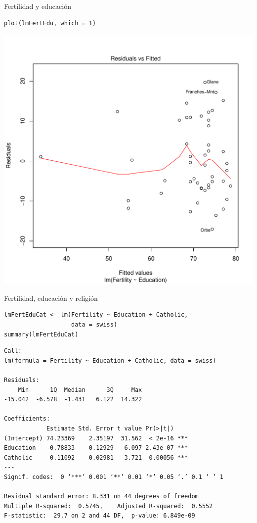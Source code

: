\documentclass[xcolor={usenames,svgnames,dvipsnames}]{beamer}
\begin{document}
\begin{frame}[fragile,label=sec-5-4]{Fertilidad y educación}
 \lstset{language=R,label= ,caption= ,numbers=none}
\begin{lstlisting}
plot(lmFertEdu, which = 1)
\end{lstlisting}

\includegraphics[height=0.85\textheight]{figs/lmFertEdu.pdf}
\end{frame}



\begin{frame}[fragile,label=sec-5-5]{Fertilidad, educación y religión}
 \lstset{language=R,label= ,caption= ,numbers=none}
\begin{lstlisting}
lmFertEduCat <- lm(Fertility ~ Education + Catholic,
                   data = swiss)
summary(lmFertEduCat)
\end{lstlisting}

\begin{verbatim}
Call:
lm(formula = Fertility ~ Education + Catholic, data = swiss)

Residuals:
    Min      1Q  Median      3Q     Max 
-15.042  -6.578  -1.431   6.122  14.322 

Coefficients:
            Estimate Std. Error t value Pr(>|t|)    
(Intercept) 74.23369    2.35197  31.562  < 2e-16 ***
Education   -0.78833    0.12929  -6.097 2.43e-07 ***
Catholic     0.11092    0.02981   3.721  0.00056 ***
---
Signif. codes:  0 ‘***’ 0.001 ‘**’ 0.01 ‘*’ 0.05 ‘.’ 0.1 ‘ ’ 1

Residual standard error: 8.331 on 44 degrees of freedom
Multiple R-squared:  0.5745,	Adjusted R-squared:  0.5552 
F-statistic:  29.7 on 2 and 44 DF,  p-value: 6.849e-09
\end{verbatim}
\end{frame}
\end{document}
